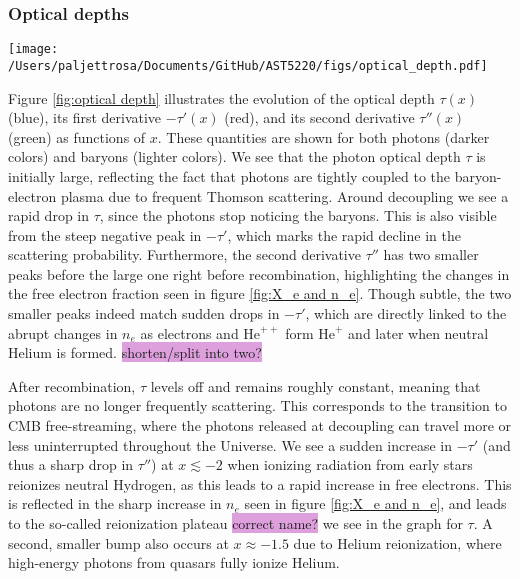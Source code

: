 \documentclass{aa}
\begin{document}
\subsubsection{Optical depths}

\begin{figure*}
  \centering
  \texttt{[image: /Users/paljettrosa/Documents/GitHub/AST5220/figs/optical\_depth.pdf]}
  \caption{The evolution of the optical depth $\tau$ (blue), its first derivative $-\tau'$ (red), and its second derivative $\tau''$ (green) for both photons (darker lines) and baryons (lighter lines). The bottom left subplot shows the evolutions of these quantities around decoupling and recombination, while the bottom right subplot highlights their changes during the epoch of reionization. The drop in $\tau$ marks photon decoupling, while the gradual decline in $\tau_b$ reflects the extended drag epoch. Reionization leads to characteristic plateaus in the optical depths that extend towards late times.}\label{fig:optical depth}
\end{figure*}

Figure \ref{fig:optical depth} illustrates the evolution of the optical depth $\tau(x)$ (blue), its first derivative $-\tau'(x)$ (red), and its second derivative $\tau''(x)$ (green) as functions of $x$. These quantities are shown for both photons (darker colors) and baryons (lighter colors). We see that the photon optical depth $\tau$ is initially large, reflecting the fact that photons are tightly coupled to the baryon-electron plasma due to frequent Thomson scattering. Around decoupling we see a rapid drop in $\tau$, since the photons stop noticing the baryons. This is also visible from the steep negative peak in $-\tau'$, which marks the rapid decline in the scattering probability. Furthermore, the second derivative $\tau''$ has two smaller peaks before the large one right before recombination, highlighting the changes in the free electron fraction seen in figure \ref{fig:X_e and n_e}. Though subtle, the two smaller peaks indeed match sudden drops in $-\tau'$, which are directly linked to the abrupt changes in $n_e$ as electrons and $\text{He}^{++}$ form $\text{He}^{+}$ and later when neutral Helium is formed. \colorbox{Plum}{shorten/split into two?}

After recombination, $\tau$ levels off and remains roughly constant, meaning that photons are no longer frequently scattering. This corresponds to the transition to CMB free-streaming, where the photons released at decoupling can travel more or less uninterrupted throughout the Universe. We see a sudden increase in $-\tau'$ (and thus a sharp drop in $\tau''$) at $x \lesssim -2$ when ionizing radiation from early stars reionizes neutral Hydrogen, as this leads to a rapid increase in free electrons. This is reflected in the sharp increase in $n_e$ seen in figure \ref{fig:X_e and n_e}, and leads to the so-called reionization plateau \colorbox{Plum}{correct name?} we see in the graph for $\tau$. A second, smaller bump also occurs at $x \approx -1.5$ due to Helium reionization, where high-energy photons from quasars fully ionize Helium.
\end{document}
